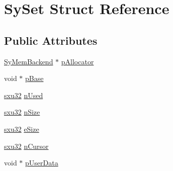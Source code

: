 \hypertarget{struct_sy_set}{\section{Sy\-Set Struct Reference}
\label{da/d82/struct_sy_set}
}
\subsection*{Public Attributes}
\begin{DoxyCompactItemize}
\item 
\hyperlink{struct_sy_mem_backend}{Sy\-Mem\-Backend} $\ast$ \hyperlink{struct_sy_set_ad5bb2614abb99d3c2d02829e5ebe86ac}{p\-Allocator}
\item 
void $\ast$ \hyperlink{struct_sy_set_a4714357de27c72d90094b9c2038f3e54}{p\-Base}
\item 
\hyperlink{unqlite_8c_abc5a8a3f345c200c98c485551f49666e}{sxu32} \hyperlink{struct_sy_set_a88226c604c945535566623fc1a648238}{n\-Used}
\item 
\hyperlink{unqlite_8c_abc5a8a3f345c200c98c485551f49666e}{sxu32} \hyperlink{struct_sy_set_a623c0c0fd8fa8a4ae28876bbf5f0a943}{n\-Size}
\item 
\hyperlink{unqlite_8c_abc5a8a3f345c200c98c485551f49666e}{sxu32} \hyperlink{struct_sy_set_a480bd3201e3292ec48e7c463377eaeb7}{e\-Size}
\item 
\hyperlink{unqlite_8c_abc5a8a3f345c200c98c485551f49666e}{sxu32} \hyperlink{struct_sy_set_a4e6034f73e0868f9334a7e418f3f2ac0}{n\-Cursor}
\item 
void $\ast$ \hyperlink{struct_sy_set_a898dab8865ebb7bd594044d377fb8377}{p\-User\-Data}
\end{DoxyCompactItemize}


